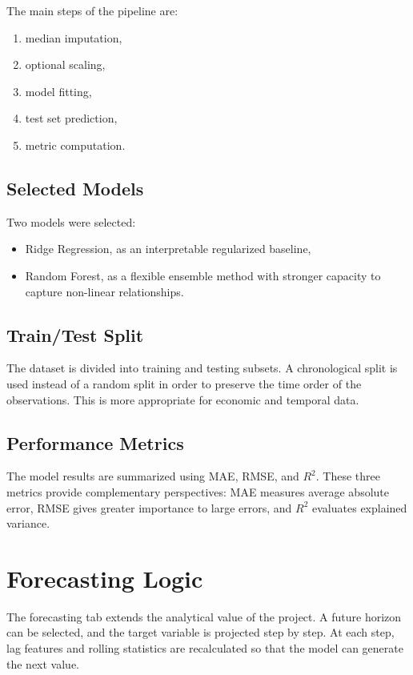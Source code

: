The main steps of the pipeline are:
\begin{enumerate}
\item median imputation,
\item optional scaling,
\item model fitting,
\item test set prediction,
\item metric computation.
\end{enumerate}

\subsection{Selected Models}

Two models were selected:
\begin{itemize}
\item Ridge Regression, as an interpretable regularized baseline,
\item Random Forest, as a flexible ensemble method with stronger capacity to capture non-linear relationships.
\end{itemize}

\subsection{Train/Test Split}

The dataset is divided into training and testing subsets.
A chronological split is used instead of a random split in order to preserve the time order of the observations.
This is more appropriate for economic and temporal data.

\subsection{Performance Metrics}

The model results are summarized using MAE, RMSE, and \(R^2\).
These three metrics provide complementary perspectives:
MAE measures average absolute error, RMSE gives greater importance to large errors, and \(R^2\) evaluates explained variance.

\section{Forecasting Logic}

The forecasting tab extends the analytical value of the project.
A future horizon can be selected, and the target variable is projected step by step.
At each step, lag features and rolling statistics are recalculated so that the model can generate the next value.

